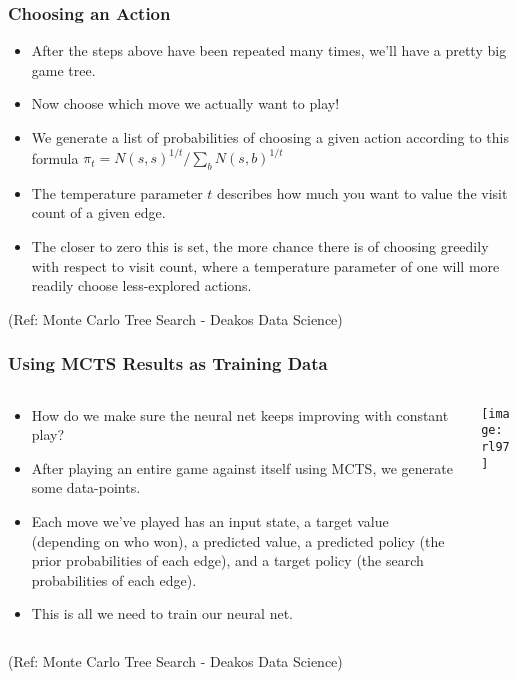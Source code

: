 \begin{frame}[fragile]\frametitle{Choosing an Action}

\begin{itemize}
\item After the steps above have been repeated many times, we’ll have a pretty big game tree. 
\item Now choose which move we actually want to play! 
\item We generate a list of probabilities of choosing a given action according to this formula $\pi_t = N(s,s)^{1/t}/\sum_b N(s,b)^{1/t}$
\item The temperature parameter $t$ describes how much you want to value the visit count of a given edge. 
\item The closer to zero this is set, the more chance there is of choosing greedily with respect to visit count, where a temperature parameter of one will more readily choose less-explored actions.
\end{itemize}


{\tiny (Ref: Monte Carlo Tree Search - Deakos Data Science)}

\end{frame}


\begin{frame}[fragile]\frametitle{Using MCTS Results as Training Data}

\begin{columns}
\begin{column}{0.5\textwidth}
\begin{itemize}
\item How do we make sure the neural net keeps improving with constant play? 
\item After playing an entire game against itself using MCTS, we generate some data-points.
\item Each move we’ve played has an input state, a target value (depending on who won), a predicted value, a predicted policy (the prior probabilities of each edge), and a target policy (the search probabilities of each edge). 
\item This is all we need to train our neural net.
\end{itemize}
\end{column}
\begin{column}{0.5\textwidth}
\begin{center}
\texttt{[image: rl97]}
\end{center}
\end{column}
\end{columns}



{\tiny (Ref: Monte Carlo Tree Search - Deakos Data Science)}

\end{frame}

